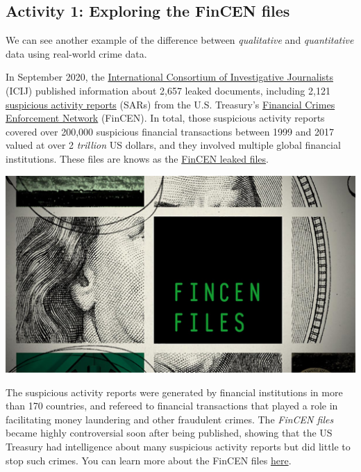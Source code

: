 \documentclass[
]{book}
\begin{document}
\hypertarget{activity-1-exploring-the-fincen-files}{%
\subsection{Activity 1: Exploring the FinCEN files}\label{activity-1-exploring-the-fincen-files}}

We can see another example of the difference between \emph{qualitative} and \emph{quantitative} data using real-world crime data.

In September 2020, the \href{https://www.icij.org/}{International Consortium of Investigative Journalists} (ICIJ) published information about 2,657 leaked documents, including 2,121 \href{https://en.wikipedia.org/wiki/Suspicious_activity_report}{suspicious activity reports} (SARs) from the U.S. Treasury's \href{https://en.wikipedia.org/wiki/Financial_Crimes_Enforcement_Network}{Financial Crimes Enforcement Network} (FinCEN). In total, those suspicious activity reports covered over 200,000 suspicious financial transactions between 1999 and 2017 valued at over 2 \emph{trillion} US dollars, and they involved multiple global financial institutions. These files are knows as the \href{https://en.wikipedia.org/wiki/FinCEN_Files}{FinCEN leaked files}.

\includegraphics{imgs/FinCEN_Files.jpg}

The suspicious activity reports were generated by financial institutions in more than 170 countries, and refereed to financial transactions that played a role in facilitating money laundering and other fraudulent crimes. The \emph{FinCEN files} became highly controversial soon after being published, showing that the US Treasury had intelligence about many suspicious activity reports but did little to stop such crimes. You can learn more about the FinCEN files \href{https://www.youtube.com/watch?v=ZAp1wOsOEDE}{here}.
\end{document}
